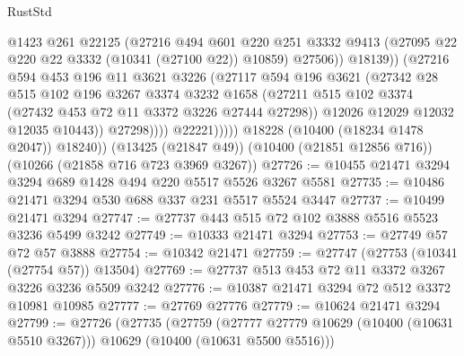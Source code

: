\begin{lexlean}{RustStd}
\begin{coremodule}
{\begin{coremodule}
{{{{{{{{{{{{{{{{{{{{{{{{{                              @1423
                              @261
                              @22125
                              (@27216
                                @494
                                @601
                                @220
                                @251
                                @3332
                                @9413
                                (@27095 @22 @220 @22 @3332 (@10341 (@27100 @22)) @10859)
                                @27506))
                            @18139))
                        (@27216
                          @594
                          @453
                          @196
                          @11
                          @3621
                          @3226
                          (@27117
                            @594
                            @196
                            @3621
                            (@27342
                              @28
                              @515
                              @102
                              @196
                              @3267
                              @3374
                              @3232
                              @1658
                              (@27211
                                @515
                                @102
                                @3374
                                (@27432 @453 @72 @11 @3372 @3226 @27444 @27298))
                              @12026
                              @12029
                              @12032
                              @12035
                              @10443))
                          @27298))))
                  @22221)))))
        @18228
        (@10400 (@18234 @1478 @2047))
        @18240))
    (@13425 (@21847 @49))
    (@10400 (@21851 @12856 @716))
    (@10266 (@21858 @716 @723 @3969 @3267))
@27726 := @10455 @21471 @3294 @3294 @689 @1428 @494 @220 @5517 @5526 @3267 @5581
@27735 := @10486 @21471 @3294 @530 @688 @337 @231 @5517 @5524 @3447
@27737 := @10499 @21471 @3294
@27747 := @27737 @443 @515 @72 @102 @3888 @5516 @5523 @3236 @5499 @3242
@27749 := @10333 @21471 @3294
@27753 := @27749 @57 @72 @57 @3888
@27754 := @10342 @21471
@27759 := @27747 (@27753 (@10341 (@27754 @57)) @13504)
@27769 := @27737 @513 @453 @72 @11 @3372 @3267 @3226 @3236 @5509 @3242
@27776 := @10387 @21471 @3294 @72 @512 @3372 @10981 @10985
@27777 := @27769 @27776
@27779 := @10624 @21471 @3294
@27799 := @27726
    (@27735
      (@27759
        (@27777 @27779 @10629 (@10400 (@10631 @5510 @3267)))
        @10629
        (@10400 (@10631 @5500 @5516)))
}}}}}}}}}}}}}}}}}}}}}}}}}
\end{coremodule}}
\end{coremodule}
\end{lexlean}
